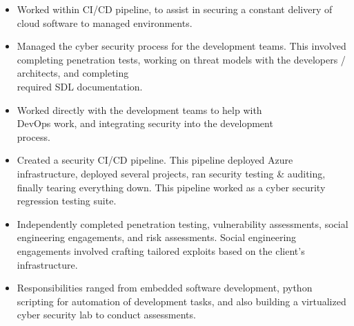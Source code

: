 \documentclass[10pt,a4paper,ragged2e]{rohrbach}
\begin{document}
\begin{paracol}{2}
\divider

\begin{itemize}
\item Worked within CI/CD pipeline, to assist in securing a constant \break delivery of cloud software to managed environments.
\item Managed the cyber security process for the development teams. This involved completing penetration tests, working on threat models with the developers / architects, and completing\\ required SDL documentation. 
\item Worked directly with the development teams to help with\\ DevOps work, and integrating security into the development\\ process.
\item Created a security CI/CD pipeline. This pipeline deployed Azure infrastructure, deployed several projects, ran security testing \& auditing, finally tearing everything down. This pipeline worked as a cyber security regression testing suite.
\end{itemize}

\begin{itemize}
\item Independently completed penetration testing, vulnerability \break assessments, social engineering engagements, and risk assessments. Social engineering engagements involved crafting tailored exploits based on the client’s infrastructure.
\end{itemize}

\divider

\begin{itemize}
\item Responsibilities ranged from embedded software development, python scripting for automation of development tasks, and also building a virtualized cyber security lab to conduct assessments. 
\end{itemize}


\end{paracol}
\end{document}
